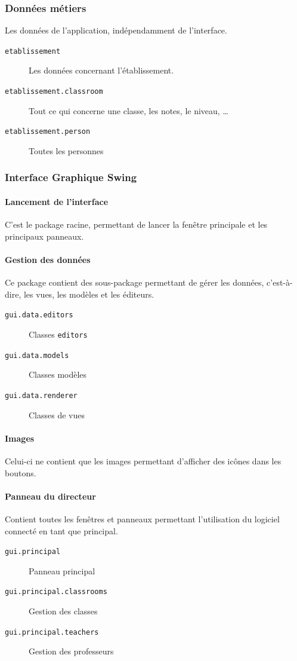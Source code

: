 \documentclass[a4paper, 11pt]{article}
\begin{document}
		\subsubsection{Données métiers}
		Les données de l'application, indépendamment de l'interface.
		\begin{description}
			\item[\texttt{etablissement}] Les données concernant l'établissement.
			\item[\texttt{etablissement.classroom}] Tout ce qui concerne une classe, les notes, le niveau, \ldots
			\item[\texttt{etablissement.person}] Toutes les personnes 
		\end{description}

		\subsubsection{Interface Graphique Swing}
			\paragraph{Lancement de l'interface} C'est le package racine, permettant de lancer la fenêtre principale et les principaux panneaux.
			\paragraph{Gestion des données} Ce package contient des sous-package permettant de gérer les données, c'est-à-dire, les vues, les modèles et les éditeurs.

		\begin{description}
			\item[\texttt{gui.data.editors}] Classes \texttt{editors}
			\item[\texttt{gui.data.models}] Classes modèles 
			\item[\texttt{gui.data.renderer}] Classes de vues 
		\end{description}
		\paragraph{Images}
		Celui-ci ne contient que les images permettant d'afficher des icônes dans les boutons.
		\paragraph{Panneau du directeur}
		Contient toutes les fenêtres et panneaux permettant l'utilisation du logiciel connecté en tant que principal.
		\begin{description}
			\item[\texttt{gui.principal}] Panneau principal
			\item[\texttt{gui.principal.classrooms}] Gestion des classes
			\item[\texttt{gui.principal.teachers}] Gestion des professeurs
		\end{description}
\end{document}
